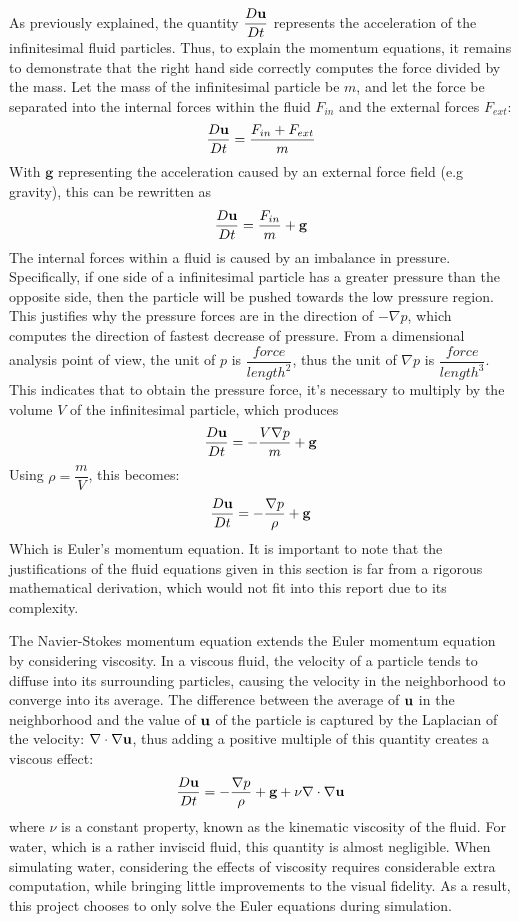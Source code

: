 As previously explained, the quantity $\dfrac{D\textbf{u}}{Dt}$ represents the acceleration of the infinitesimal fluid particles. Thus, to explain the momentum equations, it remains to demonstrate that the right hand side correctly computes the force divided by the mass. Let the mass of the infinitesimal particle be $m$, and let the force be separated into the internal forces within the fluid $F_{in}$ and the external forces $F_{ext}$:
$$
\dfrac{D\textbf{u}}{Dt} = \frac{F_{in} + F_{ext}}{m}
$$
With $\textbf{g}$ representing the acceleration caused by an external force field (e.g gravity), this can be rewritten as
$$
\dfrac{D\textbf{u}}{Dt} = \frac{F_{in}}{m} + \textbf{g}
$$
The internal forces within a fluid is caused by an imbalance in pressure. Specifically, if one side of a infinitesimal particle has a greater pressure than the opposite side, then the particle will be pushed towards the low pressure region. This justifies why the pressure forces are in the direction of $-\nabla p$, which computes the direction of fastest decrease of pressure. From a dimensional analysis point of view, the unit of $p$ is $\dfrac{force}{length^2}$, thus the unit of $\nabla p$ is $\dfrac{force}{length^3}$. This indicates that to obtain the pressure force, it's necessary to multiply by the volume $V$ of the infinitesimal particle, which produces
$$
\dfrac{D\textbf{u}}{Dt} = -\frac{V \nabla p}{m} + \textbf{g}
$$
Using $\rho = \dfrac{m}{V}$, this becomes:
$$
\dfrac{D\textbf{u}}{Dt} =  -\frac{\nabla p}{\rho} + \textbf{g}
$$
Which is Euler's momentum equation. It is important to note that the justifications of the fluid equations given in this section is far from a rigorous mathematical derivation, which would not fit into this report due to its complexity. 


The Navier-Stokes momentum equation extends the Euler momentum equation by considering viscosity. In a viscous fluid, the velocity of a particle tends to diffuse into its surrounding particles, causing the velocity in the neighborhood to converge into its average. The difference between the average of $\textbf{u}$ in the neighborhood and the value of $\textbf{u}$ of the particle is captured by the Laplacian of the velocity: $\nabla \cdot \nabla \textbf{u}$, thus adding a positive multiple of this quantity creates a viscous effect:
$$
\frac{D\textbf{u}}{Dt}   =   -\frac{\nabla p}{\rho} + \textbf{g} + \nu \nabla \cdot \nabla \textbf{u} 
$$
where $\nu$ is a constant property, known as the kinematic viscosity of the fluid. For water, which is a rather inviscid fluid, this quantity is almost negligible. When simulating water, considering the effects of viscosity requires considerable extra computation, while bringing little improvements to the visual fidelity. As a result, this project chooses to only solve the Euler equations during simulation. 


